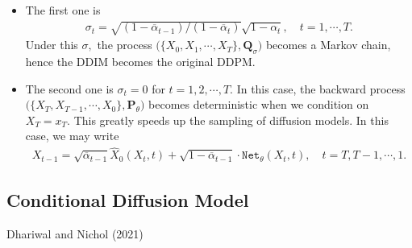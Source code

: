 \documentclass[
]{article}
\theoremstyle{remark}
\begin{document}
\begin{itemize}
\item
  The first one is \[
  \begin{aligned}
    \sigma_t = \sqrt{(1-\overline{\alpha}_{t-1})/(1-\overline{\alpha}_t)} \sqrt{ 1-\alpha_t }, \quad t = 1,\cdots, T.
  \end{aligned}
  \] Under this \(\sigma,\) the process
  \(\bigl(\lbrace X_0,X_1,\cdots,X_T \rbrace,\mathbf{Q}_{\sigma}\bigr)\)
  becomes a Markov chain, hence the DDIM becomes the original DDPM.
\item
  The second one is \(\sigma_t = 0\) for \(t=1,2,\cdots, T.\) In this
  case, the backward process
  \(\bigl(\lbrace X_T,X_{T-1},\cdots,X_0 \rbrace,\mathbf{P}_{\theta}\bigr)\)
  becomes deterministic when we condition on \(X_T = x_T.\) This greatly
  speeds up the sampling of diffusion models. In this case, we may write
  \[
  \begin{aligned}
    X_{t-1} = \sqrt{\overline{\alpha}_{t-1}} \widehat{X}_0 (X_t,t)  +  \sqrt{1-\overline{\alpha}_{t-1}} \cdot \mathtt{Net}_{\theta}(X_t,t), \quad t=T,T-1,\cdots, 1.
  \end{aligned}
  \]
\end{itemize}

\subsection{Conditional Diffusion Model}\label{sec-cdm}

Dhariwal and Nichol (2021)
\end{document}
